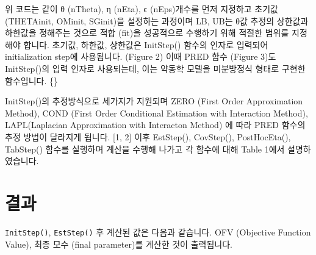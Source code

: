 \documentclass[
  12pt,
]{krantz}
\makeatletter
\newenvironment{Shaded}{\begin{snugshade}}{\end{snugshade}}
\newcommand{\CommentTok}[1]{\textcolor[rgb]{0.56,0.35,0.01}{\textit{#1}}}
\newcommand{\DataTypeTok}[1]{\textcolor[rgb]{0.13,0.29,0.53}{#1}}
\newcommand{\KeywordTok}[1]{\textcolor[rgb]{0.13,0.29,0.53}{\textbf{#1}}}
\newcommand{\NormalTok}[1]{#1}
\newcommand{\StringTok}[1]{\textcolor[rgb]{0.31,0.60,0.02}{#1}}
\newenvironment{kframe}{%
\medskip{}
\setlength{\fboxsep}{.8em}
 \def\at@end@of@kframe{}%
 \ifinner\ifhmode%
  \def\at@end@of@kframe{\end{minipage}}%
  \begin{minipage}{\columnwidth}%
 \fi\fi%
 \def\FrameCommand##1{\hskip\@totalleftmargin \hskip-\fboxsep
 \colorbox{shadecolor}{##1}\hskip-\fboxsep
     \hskip-\linewidth \hskip-\@totalleftmargin \hskip\columnwidth}%
 \MakeFramed {\advance\hsize-\width
   \@totalleftmargin\z@ \linewidth\hsize
   \@setminipage}}%
 {\par\unskip\endMakeFramed%
 \at@end@of@kframe}
\renewenvironment{Shaded}{\begin{kframe}}{\end{kframe}}
\makeatother
\begin{document}
위 코드는 같이 θ (nTheta), η (nEta), ϵ (nEps)개수를 먼저 지정하고 초기값 (THETAinit, OMinit, SGinit)을 설정하는 과정이며 LB, UB는 θ값 추정의 상한값과 하한값을 정해주는 것으로 적합 (fit)을 성공적으로 수행하기 위해 적절한 범위를 지정해야 합니다. 초기값, 하한값, 상한값은 InitStep() 함수의 인자로 입력되어 initialization step에 사용됩니다. (Figure 2) 이때 PRED 함수 (Figure 3)도 InitStep()의 입력 인자로 사용되는데, 이는 약동학 모델을 미분방정식 형태로 구현한 함수입니다. \{\citet{kang2012standard}\}

InitStep()의 추정방식으로 세가지가 지원되며 ZERO (First Order Approximation Method), COND (First Order Conditional Estimation with Interaction Method), LAPL(Laplacian Approximation with Interacton Method) 에 따라 PRED 함수의 추정 방법이 달라지게 됩니다. {[}1, 2{]} 이후 EstStep(), CovStep(), PostHocEta(), TabStep() 함수를 실행하며 계산을 수행해 나가고 각 함수에 대해 Table 1에서 설명하였습니다.

\begin{Shaded}
\end{Shaded}

\hypertarget{result}{%
\chapter{결과}\label{result}}

\texttt{InitStep()}, \texttt{EstStep()} 후 계산된 값은 다음과 같습니다. OFV (Objective Function Value), 최종 모수 (final parameter)를 계산한 것이 출력됩니다.
\end{document}
